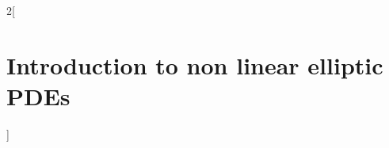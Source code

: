 \documentclass[../../../main_math.tex]{subfiles}
\begin{document}
\begin{multicols}{2}[\section{Introduction to non linear elliptic PDEs}]

\end{multicols}
\end{document}
